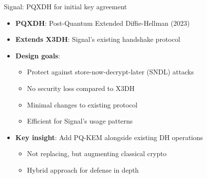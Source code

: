 \documentclass[aspectratio=169, lualatex, handout]{beamer}
\begin{document}
\begin{frame}{Signal: PQXDH for initial key agreement}
	\begin{itemize}
		\item \textbf{PQXDH}: Post-Quantum Extended Diffie-Hellman (2023)
		\item \textbf{Extends X3DH}: Signal's existing handshake protocol
		\item \textbf{Design goals}:
		      \begin{itemize}
			      \item Protect against store-now-decrypt-later (SNDL) attacks
			      \item No security loss compared to X3DH
			      \item Minimal changes to existing protocol
			      \item Efficient for Signal's usage patterns
		      \end{itemize}
		\item \textbf{Key insight}: Add PQ-KEM alongside existing DH operations
		      \begin{itemize}
			      \item Not replacing, but augmenting classical crypto
			      \item Hybrid approach for defense in depth
		      \end{itemize}
	\end{itemize}
\end{frame}
\end{document}
